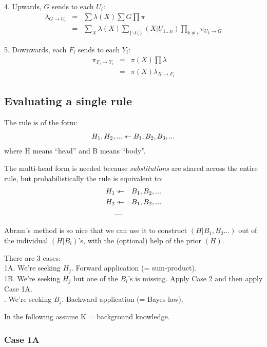 4. Upwards, $G$ sends to each $U_i$:
\begin{eqnarray}
\lambda_{G \rightarrow U_i} &=& \sum \lambda(X) \sum G \prod \pi             \nonumber \\
  &=& \sum_X \lambda(X) \sum_{\{ \backslash U_i\}} (X|U_{1...n}) \prod_{k \neq i}
      \pi_{U_k \rightarrow G}
\end{eqnarray}

5. Downwards, each $F_i$ sends to each $Y_i$:
\begin{eqnarray}
\pi_{F_i \rightarrow Y_i} &=& \pi(X) \prod \lambda                           \nonumber \\
 &=&  \pi(X) \lambda_{X \rightarrow F_i}
\end{eqnarray}

\subsection{Evaluating a single rule}

The rule is of the form:
$$ H_1, H_2, ... \leftarrowtriangle B_1, B_2, B_3, ... \nonumber $$
where H means ``head'' and B means ``body''.

The multi-head form is needed because \textit{substitutions} are shared across the entire rule,
 but probabilistically the rule is equivalent to:
\begin{eqnarray}
H_1 &\leftarrowtriangle& B_1, B_2, ... \nonumber \\
H_2 &\leftarrowtriangle& B_1, B_2, ... \nonumber \\
    &....&                 \nonumber
\end{eqnarray}

Abram's method is so nice that we can use it to construct $(H|B_1,B_2...)$ out of the individual
$(H|B_i)$'s, with the (optional) help of the prior $(H)$.

There are 3 cases:\\
\tab 1A. We're seeking $H_j$.  Forward application (= sum-product).\\
\tab 1B. We're seeking $H_j$ but one of the $B_i$'s is missing.  Apply Case 2 and
    then apply Case 1A.\\
. We're seeking $B_j$.  Backward application (= Bayes law).

In the following assume K = background knowledge.

\subsubsection{Case 1A}

